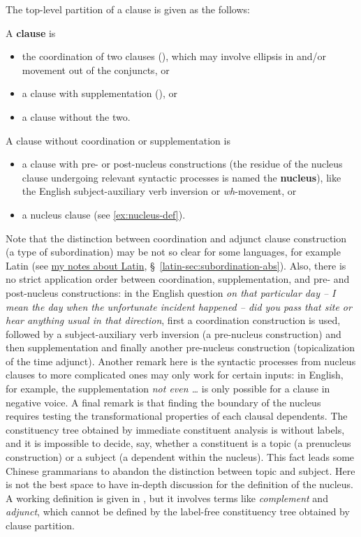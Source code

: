 \documentclass{article}
\newcommand*{\citesec}[1]{\S~{#1}}
\newcommand*{\concept}[1]{\textbf{#1}}
\newcommand*{\term}[1]{\emph{#1}}
\newcommand*{\corpus}[1]{\emph{#1}}
\newcommand{\latin}{\href{../Latin/latin-notes.pdf}{my notes about Latin}}
\begin{document}
The top-level partition of a clause is given as the follows:
\begin{exe}
    \ex\label{ex:clause-def-1} A \concept{clause} is
    \begin{itemize}
        \item the coordination of two clauses (),
        which may involve ellipsis in and/or movement out of the conjuncts, or
        \item a clause with supplementation (), or
        \item a clause without the two.
    \end{itemize}
    \ex\label{ex:clause-def-2} A clause without coordination or supplementation is 
    \begin{itemize}
        \item a clause with pre- or post-nucleus constructions
        (the residue of the nucleus clause undergoing relevant syntactic processes 
        is named the \concept{nucleus}), 
        like the English subject-auxiliary verb inversion or \term{wh}-movement, or 
        \item a nucleus clause (see \eqref{ex:nucleus-def}).
    \end{itemize}
\end{exe}
Note that the distinction between 
coordination and adjunct clause construction (a type of subordination)
may be not so clear for some languages, 
for example Latin (see \latin, \citesec{\ref{latin-sec:subordination-abs}}).
Also, there is no strict application order 
between coordination, supplementation, and pre- and post-nucleus constructions:
in the English question
\corpus{on that particular day -- I mean the day when the unfortunate incident happened -- 
did you pass that site or hear anything usual in that direction},
first a coordination construction is used, 
followed by a subject-auxiliary verb inversion (a pre-nucleus construction)
and then supplementation 
and finally another pre-nucleus construction (topicalization of the time adjunct).
Another remark here is the syntactic processes from nucleus clauses to more complicated ones 
may only work for certain inputs:
in English, for example, the supplementation \corpus{not even \dots} 
is only possible for a clause in negative voice.
A final remark is that finding the boundary of the nucleus 
requires testing the transformational properties of each clausal dependents.
The constituency tree obtained by immediate constituent analysis 
is without labels,
and it is impossible to decide, say, whether a constituent is a topic (a prenucleus construction)
or a subject (a dependent within the nucleus).
This fact leads some Chinese grammarians to abandon the distinction between topic and subject. %
Here is not the best space to have in-depth discussion for the definition of the nucleus.
A working definition is given in ,
but it involves terms like \term{complement} and \term{adjunct},
which cannot be defined by the label-free constituency tree obtained by clause partition.
\end{document}
